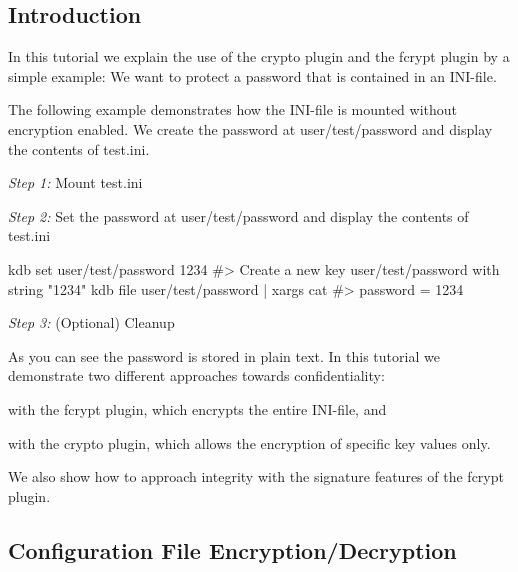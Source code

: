 \subsection*{Introduction}

In this tutorial we explain the use of the {\ttfamily crypto} plugin and the {\ttfamily fcrypt} plugin by a simple example\+: We want to protect a password that is contained in an I\+N\+I-\/file.

The following example demonstrates how the I\+N\+I-\/file is mounted without encryption enabled. We create the password at {\ttfamily user/test/password} and display the contents of {\ttfamily test.\+ini}.

{\itshape Step 1\+:} Mount {\ttfamily test.\+ini}




{\itshape Step 2\+:} Set the password at {\ttfamily user/test/password} and display the contents of {\ttfamily test.\+ini}


\begin{DoxyCode}
kdb set user/test/password 1234
#> Create a new key user/test/password with string "1234"
kdb file user/test/password | xargs cat
#> password = 1234
\end{DoxyCode}


{\itshape Step 3\+:} (Optional) Cleanup




As you can see the password is stored in plain text. In this tutorial we demonstrate two different approaches towards confidentiality\+:


\begin{DoxyEnumerate}
\item with the {\ttfamily fcrypt} plugin, which encrypts the entire I\+N\+I-\/file, and
\item with the {\ttfamily crypto} plugin, which allows the encryption of specific key values only.
\end{DoxyEnumerate}

We also show how to approach integrity with the signature features of the {\ttfamily fcrypt} plugin.

\subsection*{Configuration File Encryption/\+Decryption}

